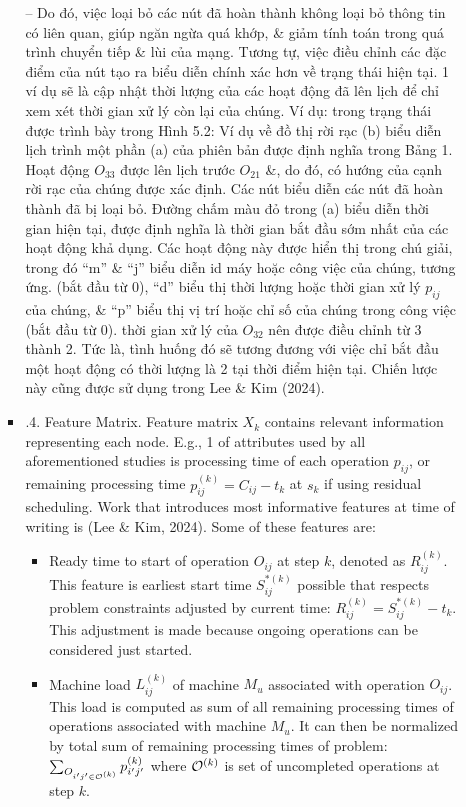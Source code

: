 \documentclass{article}
\begin{document}
\begin{itemize}
\begin{itemize}
\begin{itemize}
            -- Do đó, việc loại bỏ các nút đã hoàn thành không loại bỏ thông tin có liên quan, giúp ngăn ngừa quá khớp, \& giảm tính toán trong quá trình chuyển tiếp \& lùi của mạng. Tương tự, việc điều chỉnh các đặc điểm của nút tạo ra biểu diễn chính xác hơn về trạng thái hiện tại. 1 ví dụ sẽ là cập nhật thời lượng của các hoạt động đã lên lịch để chỉ xem xét thời gian xử lý còn lại của chúng. Ví dụ: trong trạng thái được trình bày trong {\sf Hình 5.2: Ví dụ về đồ thị rời rạc (b) biểu diễn lịch trình một phần (a) của phiên bản được định nghĩa trong Bảng 1. Hoạt động $O_{33}$ được lên lịch trước $O_{21}$ \&, do đó, có hướng của cạnh rời rạc của chúng được xác định. Các nút biểu diễn các nút đã hoàn thành đã bị loại bỏ. Đường chấm màu đỏ trong (a) biểu diễn thời gian hiện tại, được định nghĩa là thời gian bắt đầu sớm nhất của các hoạt động khả dụng. Các hoạt động này được hiển thị trong chú giải, trong đó ``m'' \& ``j'' biểu diễn id máy hoặc công việc của chúng, tương ứng. (bắt đầu từ 0), ``d'' biểu thị thời lượng hoặc thời gian xử lý $p_{ij}$ của chúng, \& ``p'' biểu thị vị trí hoặc chỉ số của chúng trong công việc (bắt đầu từ 0).} thời gian xử lý của $O_{32}$ nên được điều chỉnh từ 3 thành 2. Tức là, tình huống đó sẽ tương đương với việc chỉ bắt đầu một hoạt động có thời lượng là 2 tại thời điểm hiện tại. Chiến lược này cũng được sử dụng trong Lee \& Kim (2024).
            \item {.4. Feature Matrix.} Feature matrix $X_k$ contains relevant information representing each node. E.g., 1 of attributes used by all aforementioned studies is processing time of each operation $p_{ij}$, or remaining processing time $p_{ij}^{(k)} = C_{ij} - t_k$ at $s_k$ if using residual scheduling. Work that introduces most informative features at time of writing is (Lee \& Kim, 2024). Some of these features are:
            \begin{itemize}
                \item Ready time to start of operation $O_{ij}$ at step $k$, denoted as $R_{ij}^{(k)}$. This feature is earliest start time $S_{ij}^{*(k)}$ possible that respects problem constraints adjusted by current time: $R_{ij}^{(k)} = S_{ij}^{*(k)} - t_k$. This adjustment is made because ongoing operations can be considered just started.
                \item Machine load $L_{ij}^{(k)}$ of machine $M_u$ associated with operation $O_{ij}$. This load is computed as sum of all remaining processing times of operations associated with machine $M_u$. It can then be normalized by total sum of remaining processing times of problem: $\sum_{O_{i'j'\in{\cal O}^{(k)}}} p_{i'j'}^{(k)}$ where ${\cal O}^{(k)}$ is set of uncompleted operations at step $k$.

\end{itemize}
\end{itemize}
\end{itemize}
\end{itemize}
\end{document}
